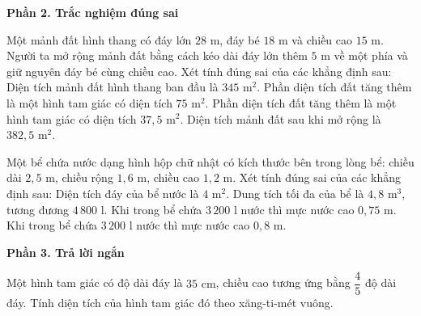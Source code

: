 \textbf{Phần 2. Trắc nghiệm đúng sai}

\begin{ex} %
Một mảnh đất hình thang có đáy lớn $28\text{ m}$, đáy bé $18\text{ m}$ và chiều cao $15\text{ m}$. Người ta mở rộng mảnh đất bằng cách kéo dài đáy lớn thêm $5\text{ m}$ về một phía và giữ nguyên đáy bé cùng chiều cao. Xét tính đúng sai của các khẳng định sau:
\choiceTF
{\True Diện tích mảnh đất hình thang ban đầu là $345\text{ m}^2$.}
{Phần diện tích đất tăng thêm là một hình tam giác có diện tích $75\text{ m}^2$.}
{\True Phần diện tích đất tăng thêm là một hình tam giác có diện tích $37{,}5\text{ m}^2$.}
{\True Diện tích mảnh đất sau khi mở rộng là $382{,}5\text{ m}^2$.}
\end{ex}

\begin{ex} %
Một bể chứa nước dạng hình hộp chữ nhật có kích thước bên trong lòng bể: chiều dài $2{,}5\text{ m}$, chiều rộng $1{,}6\text{ m}$, chiều cao $1{,}2\text{ m}$. Xét tính đúng sai của các khẳng định sau:
\choiceTF
{\True Diện tích đáy của bể nước là $4\text{ m}^2$.}
{\True Dung tích tối đa của bể là $4{,}8\text{ m}^3$, tương đương $4\,800\text{ l}$.}
{Khi trong bể chứa $3\,200\text{ l}$ nước thì mực nước cao $0{,}75\text{ m}$.}
{\True Khi trong bể chứa $3\,200\text{ l}$ nước thì mực nước cao $0{,}8\text{ m}$.}
\end{ex}

\textbf{Phần 3. Trả lời ngắn}

\begin{ex} %
Một hình tam giác có độ dài đáy là $35\text{ cm}$, chiều cao tương ứng bằng $\dfrac{4}{5}$ độ dài đáy. Tính diện tích của hình tam giác đó theo xăng-ti-mét vuông.
\end{ex}

